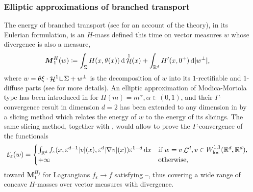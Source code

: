 \documentclass[10pt]{amsart}
\theoremstyle{plain}
\theoremstyle{definition}
\newcommand{\dd}{\mathop{}\mathopen{}\mathrm{d}}
\newcommand{\R}{\mathbb{R}}
\newcommand{\ener}{\mathcal{E}}
\newcommand{\mass}{\boldsymbol{M}}
\newcommand{\mres}{\mathop{\hbox{\vrule height 6pt width .5pt depth 0pt \vrule height .5pt width 4pt depth 0pt}}\nolimits}
\newcommand{\loc}{\mathrm{loc}}
\newcommand{\eps}{\varepsilon}
\DeclarePairedDelimiter{\abs}{\lvert}{\rvert}
\DeclareMathOperator{\hdm}{\mathcal{H}}
\DeclareMathOperator{\lbm}{\mathcal{L}}
\begin{document}
\subsubsection*{Elliptic approximations of branched transport}
The energy of branched transport (see \cite{bernotOptimalTransportationNetworks2009} for an account of the theory), in its Eulerian formulation, is an $H$-mass defined this time on vector measures $w$ whose divergence is also a measure,
\begin{equation}
\mass_1^H(w)\coloneqq\int_\Sigma H(x,\theta(x))\dd\hdm^1(x)+\int_{\R^d} H'(x,0^+)\dd\abs{w^\perp},
\end{equation}
where $w = \theta \xi \cdot \hdm^1 \mres \Sigma + w^\perp$ is the decomposition of $w$ into its $1$-rectifiable and $1$\nobreakdash-diffuse parts (see  for more details). An elliptic approximation of Modica-Mortola type has been introduced in \cite{oudetModicaMortolaApproximationBranched2011} for $H(m) = m^\alpha, \alpha \in (0,1)$, and their $\Gamma$\nobreakdash-con\-vergence result in dimension $d=2$ has been extended to any dimension in \cite{monteilEllipticApproximationsSingular2015} by a slicing method which relates the energy of $w$ to the energy of its slicings. The same slicing method, together with , would allow to prove the $\Gamma$-convergence of the functionals
\begin{equation}
\ener_\eps(w)=
\begin{cases}
\int_{\R^d}f_\eps(x,\eps^{d-1} \abs{v}(x), \eps^{d}\abs{\nabla v}(x)) \eps^{1-d} \dd x &\text{if \(w = v\lbm^d , v\in W^{1,1}_\loc(\R^d,\R^d)\),}\\
+\infty&\text{otherwise,}
\end{cases}
\end{equation}
toward \(\mass_1^{H_f}\) for Lagrangians \(f_\eps\to f\) satisfying --, thus covering a wide range of concave $H$-masses over vector measures with divergence.
\end{document}
